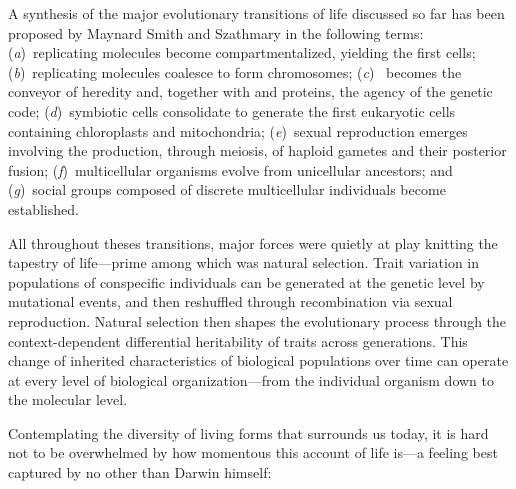 

A synthesis of the major evolutionary transitions of life discussed so far has
been proposed by Maynard Smith and Szathmary in the following
terms:\cite{maynard_smith_major_1997} (\emph{a})~replicating molecules become
compartmentalized, yielding the first cells; (\emph{b})~replicating molecules
coalesce to form chromosomes; (\emph{c})~ becomes the conveyor of
heredity and, together with  and proteins, the agency of the
genetic code; (\emph{d})~symbiotic cells consolidate to generate the first
eukaryotic cells containing chloroplasts and mitochondria; (\emph{e})~sexual
reproduction emerges involving the production, through meiosis, of haploid
gametes and their posterior fusion; (\emph{f})~multicellular organisms evolve
from unicellular ancestors; and (\emph{g})~social groups composed of discrete
multicellular individuals become established.

All throughout theses transitions, major forces were quietly at play knitting
the tapestry of life---prime among which was natural selection.  Trait variation
in populations of conspecific individuals can be generated at the genetic level
by mutational events, and then reshuffled through recombination via sexual
reproduction.  Natural selection then shapes the evolutionary process through
the \mbox{context-dependent} differential heritability of traits across
generations.  This change of inherited characteristics of biological populations
over time can operate at every level of biological organization---from the
individual organism down to the molecular level.

\bigskip

Contemplating the diversity of living forms that surrounds us today, it is hard
not to be overwhelmed by how momentous this account of life is---a feeling best
captured by no other than Darwin himself:\cite{darwin_origin_1864}




